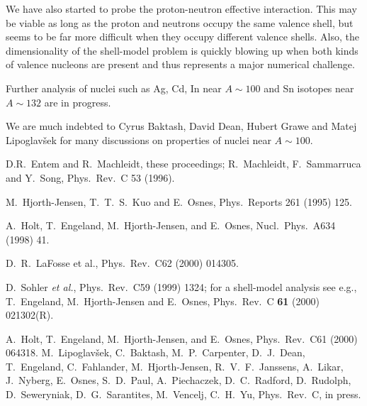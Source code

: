 \documentclass{ws-p8-50x6-00}
\begin{document}
We have also started to probe the proton-neutron effective interaction. 
This may be viable as long as the proton and neutrons occupy 
the same valence shell, but seems to be far more difficult 
when they occupy different valence shells. Also, 
the dimensionality of the shell-model problem is quickly 
blowing up when both kinds of valence nucleons 
are present and thus represents a major numerical challenge. 

Further analysis of nuclei such as Ag, Cd, In near $A\sim 100$ and
Sn isotopes near $A\sim 132$ are in progress.
 
We are much indebted to Cyrus Baktash, David Dean, Hubert Grawe
and Matej Lipoglav\v{s}ek
for many discussions on properties of nuclei near $A\sim 100$.

\begin{thebibliography}{200}

 D.R.\ Entem and R.\ Machleidt, these proceedings; 
R.\ Machleidt, F.\ Sammarruca and Y.\ Song,
Phys.\ Rev.\ C 53 (1996).

  M.\ Hjorth-Jensen, T.\ T.\ S.\ Kuo and
E.\ Osnes, Phys.\ Reports 261 (1995) 125.


 A.~Holt, T.~Engeland, M.~Hjorth-Jensen, and E.~Osnes,
                 Nucl.~Phys.~A634 (1998) 41.

 D.~R.~LaFosse et al., Phys.~Rev.~C62 (2000) 014305.  

 D.~Sohler {\em et al.}, Phys.~Rev.~C59 (1999) 1324; for a
shell-model analysis see e.g., 
T.~Engeland, M.~Hjorth-Jensen and E.~Osnes, 
Phys.~Rev.~C {\bf 61} (2000) 021302(R).


 A.~Holt, T.~Engeland, M.~Hjorth-Jensen, and E.~Osnes,
                 Phys.~Rev.~C61 (2000) 064318.
M.~Lipoglav\v{s}ek, C.~Baktash,
M.~P.~Carpenter,
D.~J.~Dean,
T.~Engeland,
C.~Fahlander,
M.~Hjorth-Jensen,
R.~V.~F.~Janssens,
A.~Likar,
J.~Nyberg,
E.~Osnes,
S.~D.~Paul,
A.~Piechaczek,
D.~C.~Radford,
D.~Rudolph,
D.~Seweryniak,
D.~G.~Sarantites,
M.~Vencelj,
C.~H.~Yu, Phys.\ Rev.\ C, in press.

\end{thebibliography}
\end{document}
